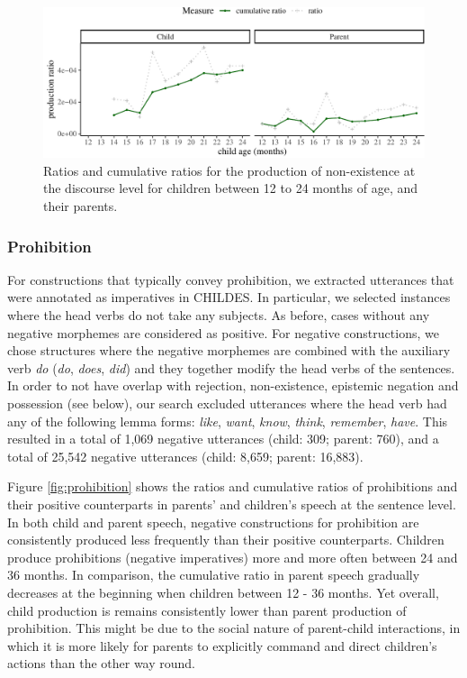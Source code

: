 \documentclass[
  english,
  man,floatsintext]{apa6}
\begin{document}
\begin{figure}[H]

{\centering \includegraphics{neg_construction_article_files/figure-latex/existencediscoursebegin-1} 

}

\caption{Ratios and cumulative ratios for the production of non-existence at the discourse level for children between 12 to 24 months of age, and their parents.}\label{fig:existencediscoursebegin}
\end{figure}

\hypertarget{prohibition}{%
\subsubsection{Prohibition}\label{prohibition}}

For constructions that typically convey prohibition, we extracted utterances that were annotated as imperatives in CHILDES. In particular, we selected instances where the head verbs do not take any subjects. As before, cases without any negative morphemes are considered as positive. For negative constructions, we chose structures where the negative morphemes are combined with the auxiliary verb \emph{do} (\emph{do}, \emph{does}, \emph{did}) and they together modify the head verbs of the sentences. In order to not have overlap with rejection, non-existence, epistemic negation and possession (see below), our search excluded utterances where the head verb had any of the following lemma forms: \emph{like}, \emph{want}, \emph{know}, \emph{think}, \emph{remember}, \emph{have}. This resulted in a total of 1,069 negative utterances (child: 309; parent: 760), and a total of 25,542 negative utterances (child: 8,659; parent: 16,883).

Figure \ref{fig:prohibition} shows the ratios and cumulative ratios of prohibitions and their positive counterparts in parents' and children's speech at the sentence level. In both child and parent speech, negative constructions for prohibition are consistently produced less frequently than their positive counterparts. Children produce prohibitions (negative imperatives) more and more often between 24 and 36 months. In comparison, the cumulative ratio in parent speech gradually decreases at the beginning when children between 12 - 36 months. Yet overall, child production is remains consistently lower than parent production of prohibition. This might be due to the social nature of parent-child interactions, in which it is more likely for parents to explicitly command and direct children's actions than the other way round.
\end{document}
